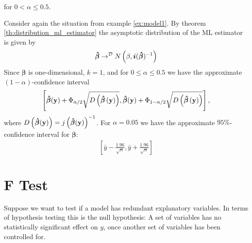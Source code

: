 for $0 < \alpha \leq 0.5$. 


\begin{example}
Consider again the situation from example \ref{ex:model1}. By theorem \ref{th:distribution_ml_estimator} the asymptotic distribution of the ML estimator is given by
\begin{align*}
    \operatorname{\boldsymbol{\hat{\beta}}} \rightarrow^\mathcal{D} N\left( \mathbf{ \beta }, \boldsymbol{i}(\operatorname{\boldsymbol{\hat{\beta}}})^{-1} \right)
\end{align*}
Since $\mathbf{\beta}$ is one-dimensional, $k=1$, and for $0\leq \alpha \leq 0.5$ we have the approximate $(1-\alpha)$-confidence interval
\begin{align*}
\left[ \operatorname{\boldsymbol{\hat{\beta}}}(\mathbf{y}) + \Phi_{\alpha/2} \sqrt{D\left( \operatorname{\boldsymbol{\hat{\beta}}}\left(\mathbf{y}\right)\right)}, \operatorname{\boldsymbol{\hat{\beta}}}(\mathbf{y}) + \Phi_{1 - \alpha/2} \sqrt{D\left( \operatorname{\boldsymbol{\hat{\beta}}}\left(\mathbf{y}\right)\right)} \right],
\end{align*}
where $D\left(\operatorname{\boldsymbol{\hat{\beta}}}(\mathbf{y})\right) = j\left(\operatorname{\boldsymbol{\hat{\beta}}}(\mathbf{y})\right)^{-1}$.
For $\alpha=0.05$ we have the approximate $95\%$-confidence interval for $\mathbf{\beta}$:
\begin{align*}
\left[ \bar{y} - \frac{1.96}{\sqrt{n}}, \bar{y} + \frac{1.96}{\sqrt{n}} \right]    
\end{align*}
\end{example}


\section{F Test}

Suppose we want to test if a model has redundant explanatory variables.
In terms of hypothesis testing this is the null hypothesis: A set of variables has no statistically significant effect on $y$, once another set of variables has been controlled for. 

